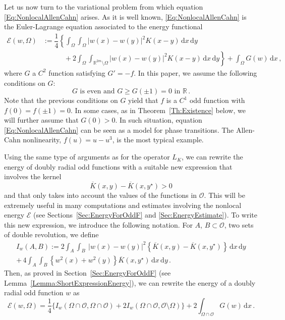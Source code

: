 \documentclass[12pt,reqno]{amsart}
\theoremstyle{definition}
\theoremstyle{remark}
\newcommand{\con}[1]{\mathbb{#1}}
\newcommand{\R}{\con{R}} %
\newcommand{\ecal}{\mathcal{E}}
\newcommand{\ocal}{\mathcal{O}}
\renewcommand{\d}{\,\mathrm{d}} %
\numberwithin{equation}{section}
\begin{document}
	
	Let us now turn to the variational problem from which equation \eqref{Eq:NonlocalAllenCahn} arises. As it is well known, \eqref{Eq:NonlocalAllenCahn} is the Euler-Lagrange equation associated to the energy functional
	\begin{equation}
	\label{Eq:Energy}
	\begin{split}
	\ecal(w, \Omega) &:= 
	\dfrac{1}{4} \left \{ \int_\Omega \int_\Omega |w(x) - w(y)|^2 K(x-y) \d x \d y \right. \qquad \qquad \\
	& \quad \quad \quad +\left. 2 \int_\Omega \int_{\R^{2m} \setminus \Omega} |w(x) - w(y)|^2 K(x-y) \d x \d y \right \} + \int_{\Omega} G(w) \d x \,,
	\end{split}
	\end{equation}
	where $G$ a $C^2$ function satisfying $G' = -f$. In this paper, we assume the following conditions on $G$:
	\begin{equation}
	\label{Eq:HipothesesG}
	G \textrm{ is even and } G\geq G(\pm 1 )=0 \textrm{ in } \R\,.
	\end{equation}
	Note that the previous conditions on $G$ yield that $f$ is a $C^1$ odd function with $f(0)=f(\pm 1)=0$. In some cases, as in Theorem~\ref{Th:Existence} below, we will further assume that $G(0)>0$. In such situation, equation \eqref{Eq:NonlocalAllenCahn} can be seen as a model for phase transitions. The Allen-Cahn nonlinearity, $f(u) = u-u^3$, is the most typical example.
	
	
	Using the same type of arguments as for the operator $L_K$, we can rewrite the energy of doubly radial odd functions with a suitable new expression that involves the kernel 
	$$\overline{K}(x,y)-\overline{K}(x,y^\star)>0$$
	and that only takes into account the values of the functions in $\ocal$. This will be extremely useful in many computations and estimates involving the nonlocal energy $\ecal$ (see Sections~\ref{Sec:EnergyForOddF} and \ref{Sec:EnergyEstimate}). To write this new expression, we introduce the following notation.  For $A$, $B\subset \ocal$, two sets of double revolution, we define
	\begin{equation*}
	\begin{split}
	I_w(A,B) := 2\int_A  \int_B  \ |w(x)-w(y)|^2 \left\{ \overline{K}(x,y) - \overline{K}(x,y^\star) \right\} \d x \d y  \\
	+\, 4 \int_A  \int_B  \left\{w^2(x)+w^2(y)\right\} \overline{K}(x,y^\star) \d x \d y\,.
	\end{split}
	\end{equation*}
	Then, as proved in Section~\ref{Sec:EnergyForOddF} (see Lemma~\ref{Lemma:ShortExpressionEnergy}), we can rewrite the energy of a doubly radial odd function $w$ as
	\begin{equation}
	\label{Eq:ShortExpressionEnergyIntro}
	\ecal(w, \Omega) = \frac{1}{4} \big \{I_w(\Omega\cap\ocal,\Omega\cap\ocal) +  2I_w(\Omega\cap\ocal,\ocal\setminus\Omega) \big \} + 2\int_{\Omega\cap \ocal} G(w) \d x \,.
	\end{equation}
	
\end{document}
